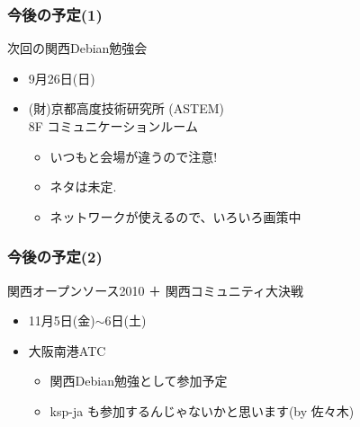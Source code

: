 \documentclass[cjk,dvipdfmx,12pt,%
hyperref={bookmarks=true,bookmarksnumbered=true,bookmarksopen=false,%
colorlinks=false,%
pdftitle={第38回関西Debian勉強会},%
pdfauthor={倉敷・のがた・佐々木},%
pdfsubject={資料},%
}]{beamer}
\begin{document}


\begin{frame}[fragile]
\frametitle{今後の予定(1)}


\begin{block}{次回の関西Debian勉強会}
\begin{itemize}
\item 9月26日(日)
\item (財)京都高度技術研究所 (ASTEM) \\ 8F コミュニケーションルーム
   \begin{itemize}
    \item いつもと会場が違うので注意!
    \item ネタは未定.
    \item ネットワークが使えるので、いろいろ画策中
   \end{itemize}
\end{itemize}
\end{block}


\end{frame}

\begin{frame}[fragile]
\frametitle{今後の予定(2)}


\begin{block}{関西オープンソース2010 ＋ 関西コミュニティ大決戦}
  \begin{itemize}
    \item 11月5日(金)$\sim$6日(土)
    \item 大阪南港ATC
       \begin{itemize}
         \item 関西Debian勉強として参加予定
         \item ksp-ja も参加するんじゃないかと思います(by 佐々木)
       \end{itemize}
  \end{itemize}
\end{block}


\end{frame}


\takahashi[50]{　}
\end{document}
